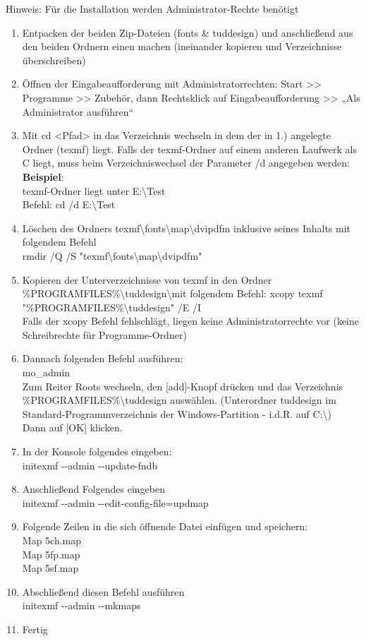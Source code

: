 			\noindent Hinweis: Für die Installation werden Administrator-Rechte benötigt
			\begin{enumerate}
				\item	Entpacken der beiden Zip-Dateien (fonts \& tuddesign) und anschließend aus den beiden Ordnern einen machen (ineinander kopieren und Verzeichnisse überschreiben)
				\item	Öffnen der Eingabeaufforderung mit Administratorrechten: Start >> Programme >> Zubehör, dann Rechtsklick auf Eingabeaufforderung >> „Als Administrator ausführen“
				\item	Mit cd <Pfad> in das Verzeichnis wechseln in dem der in 1.) angelegte Ordner (texmf) liegt. Falls der texmf-Ordner auf einem anderen Laufwerk als C liegt, muss beim Verzeichniswechsel der Parameter /d angegeben werden:\\
				\textbf{Beispiel}: \\
				texmf-Ordner liegt unter E:\textbackslash Test\\
				Befehl: cd /d E:\textbackslash Test
				\item	Löschen des Ordners texmf\textbackslash fonts\textbackslash map\textbackslash dvipdfm inklusive seines Inhalts mit folgendem Befehl\\
				rmdir /Q /S "texmf\textbackslash fonts\textbackslash map\textbackslash dvipdfm"
				\item	Kopieren der Unterverzeichnisse von texmf in den Ordner \%PROGRAMFILES\%\textbackslash tuddesign\textbackslash mit folgendem Befehl: 
				xcopy texmf "\%PROGRAMFILES\%\textbackslash tuddesign" /E /I\\
				Falls der xcopy Befehl fehlschlägt, liegen keine Administratorrechte vor (keine Schreibrechte für Programme-Ordner)
				\item	Dannach folgenden Befehl ausführen:\\
				mo\_admin\\
				Zum Reiter Roots wechseln, den [add]-Knopf drücken und das Verzeichnis \%PROGRAMFILES\%\textbackslash tuddesign auswählen. (Unterordner tuddesign im Standard-Programmverzeichnis der Windows-Partition - i.d.R. auf C:\textbackslash)\\ Dann auf [OK] klicken.
				\item	In der Konsole folgendes eingeben:\\
				initexmf -{}-admin -{}-update-fndb
				\item	Anschließend Folgendes eingeben\\
				initexmf -{}-admin -{}-edit-config-file=updmap
				\item	Folgende Zeilen in die sich öffnende Datei einfügen und speichern:\\
				Map 5ch.map\\
				Map 5fp.map\\
				Map 5sf.map
				\item	Abschließend diesen Befehl ausführen\\
				initexmf -{}-admin -{}-mkmaps
				\item	Fertig			
			\end{enumerate}
			
